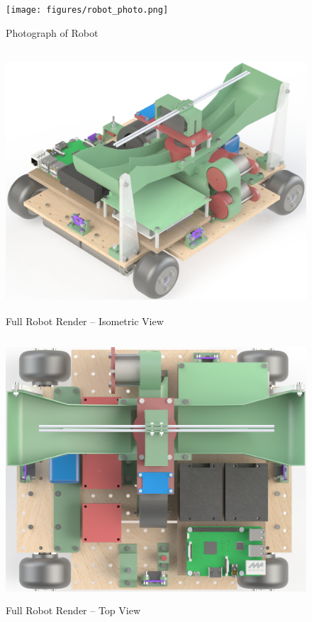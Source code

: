 \begin{figure}[H]   %
	\centering \texttt{[image: figures/robot\_photo.png]}
	\caption{Photograph of Robot}	\label{fig:robot_photo}
\end{figure}
\begin{figure}[H]   %
	\centering \includegraphics[width=6in, height=3.85in, keepaspectratio]{figures/render_isometric.png}
	\caption{Full Robot Render -- Isometric View}\label{fig:render_isometric}
\end{figure}
\begin{figure}[H]   %
	\centering \includegraphics[width=6in, height=3.85in, keepaspectratio]{figures/render_top.png}
	\caption{Full Robot Render -- Top View}	\label{fig:render_top}
\end{figure}
